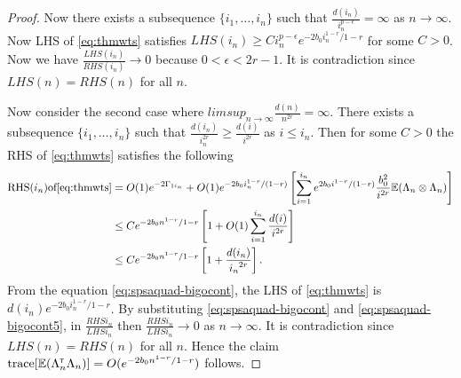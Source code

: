 \begin{proof}
Now there exists a subsequence $\{i_1,\ldots,i_n\}$ such that $ \frac{d(i_n)}{i_n^{p-\epsilon}} = \infty$ as $n \to \infty$. Now LHS of \eqref{eq:thmwts} satisfies $LHS(i_n) \ge C i_n^{p-\epsilon} e^{-2b_0 i_n^{1-r} / {1-r}}$ for some $C > 0$. Now we have $\frac{LHS(i_n)}{RHS(i_n)} \to 0$ because  $0 < \epsilon < 2r -1$. It is contradiction since $LHS(n) = RHS(n)$ for all $n$.

Now consider the second case where $lim sup_{n \to \infty} \frac{d(n)}{n^{2r}} = \infty$. There exists a subsequence $\{i_1,\ldots,i_n\}$ such that $ \frac{d(i_n)}{i_n^{2r}} \ge \frac{d(i)}{i^{2r}}$ as $i \le i_n$. Then for some $C >0$ the RHS of \eqref{eq:thmwts} satisfies the following 
\begin{align}
\text{RHS}(i_n)  \text{of}  \eqref{eq:thmwts} &= O(1) e^{-2 \Gamma_{1i_n}} +  O(1) e^{-2 b_0 i_n^{1-r}/(1-r)} \left[\sum_{i=1}^{i_n} e^{2 b_0 i^{1-r}/(1-r)} \frac{b_0^2}{i^{2r}} \mathbb{E} (\Lambda_{n} \otimes \Lambda_{n}) \right]\nonumber \\
&\le C e^{-2b_0n^{1-r} / {1-r}} \left[ 1 + O(1) \sum_{i =1}^{i_n} \frac{d(i)}{i^{2r}}\right]\nonumber \\
&\le C e^{-2b_0n^{1-r} / {1-r}} \left[ 1 + \frac{d(i_n)}{{i_n}^{2r}}\right].
\label{eq:spsaquad-bigocont5}
\end{align}
From the equation \eqref{eq:spsaquad-bigocont}, the  LHS of \eqref{eq:thmwts} is $d(i_n) e^{-2b_0 i_n^{1-r} / {1-r}}$. By substituting \eqref{eq:spsaquad-bigocont} and \eqref{eq:spsaquad-bigocont5}, in $\frac{RHS{i_n}}{LHS{i_n}}$ then $\frac{RHS{i_n}}{LHS{i_n}} \to 0$ as $n \to \infty$. It is contradiction since $LHS(n) = RHS(n)$ for all $n$. Hence the claim $\text{trace}[\mathbb{E} (\Lambda_n ^\mathsf{\scriptscriptstyle T} \Lambda_n)] = O(e^{-2b_0n^{1-r} / {1-r}})$ follows.
\end{proof}



